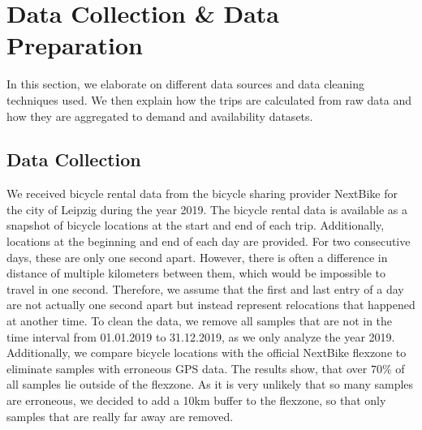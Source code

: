 \section{Data Collection \& Data Preparation}
\label{sec:data_collection_and_data_preparation}
In this section, we elaborate on different data sources and data cleaning techniques used. We then explain how the trips are calculated from raw data and how they are aggregated to demand and availability datasets.


\subsection{Data Collection}
We received bicycle rental data from the bicycle sharing provider NextBike for the city of Leipzig during the year 2019.
% 
The bicycle rental data is available as a snapshot of bicycle locations at the start and end of each trip. Additionally, locations at the beginning and end of each day are provided. For two consecutive days, these are only one second apart. However, there is often a difference in distance of multiple kilometers between them, which would be impossible to travel in one second.
Therefore, we assume that the first and last entry of a day are not actually one second apart but instead represent relocations that happened at another time. To clean the data, we remove all samples that are not in the time interval from 01.01.2019 to 31.12.2019, as we only analyze the year 2019. Additionally, we compare bicycle locations with the official NextBike flexzone to eliminate samples with erroneous GPS data. The results show, that over \(70\%\) of all samples lie outside of the flexzone. As it is very unlikely that so many samples are erroneous, we decided to add a 10km buffer to the flexzone, so that only samples that are really far away are removed.

